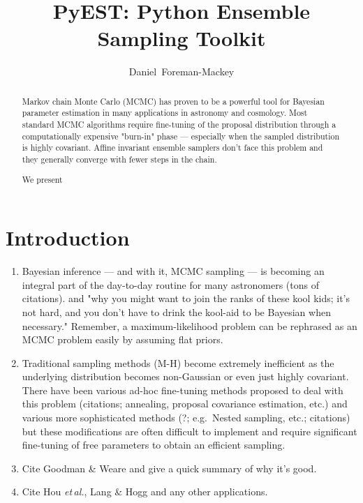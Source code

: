 \documentclass[12pt,preprint]{aastex}
\newcommand{\foreign}[1]{\emph{#1}}
\newcommand{\etal}{\foreign{et\,al.}}
\begin{document}
\title{PyEST: Python Ensemble Sampling Toolkit}
\author{Daniel~Foreman-Mackey}

\begin{abstract}

    Markov chain Monte Carlo (MCMC) has proven to be a powerful tool for Bayesian
    parameter estimation in many applications in astronomy and cosmology.  Most
    standard MCMC algorithms require fine-tuning of the proposal distribution
    through a computationally expensive "burn-in" phase --- especially when the
    sampled distribution is highly covariant.
    Affine invariant ensemble samplers don't face this problem and they generally
    converge with fewer steps in the chain.

    We present

\end{abstract}

\keywords{
}

\section{Introduction}

\begin{enumerate}

    \item Bayesian inference  --- and with it, MCMC sampling --- is becoming an
        integral part of the day-to-day routine for many astronomers (tons of
        citations). and "why you might want to join the ranks of these kool kids;
        it's not hard, and you don't have to drink the kool-aid to be Bayesian
        when necessary." Remember, a maximum-likelihood problem can be rephrased
        as an MCMC problem easily by assuming flat priors.

    \item Traditional sampling methods (M-H) become extremely inefficient as the
        underlying distribution becomes non-Gaussian or even just highly covariant.
        There have been various ad-hoc fine-tuning methods proposed to deal with
        this problem (citations; annealing, proposal covariance estimation, etc.)
        and various more sophisticated methods (?; e.g.~Nested sampling, etc.;
        citations) but these modifications are often difficult to implement and
        require significant fine-tuning of free parameters to obtain an efficient
        sampling.

    \item Cite Goodman \& Weare and give a quick summary of why it's good.

    \item Cite Hou \etal, Lang \& Hogg and any other applications.

\end{enumerate}
\end{document}
